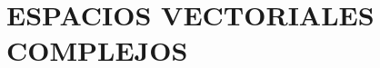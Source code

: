 \chapter[ESPACIOS VECTORIALES COMPLEJOS]{ESPACIOS VECTORIALES \\ COMPLEJOS}\label{chap:espacios_complejos}
